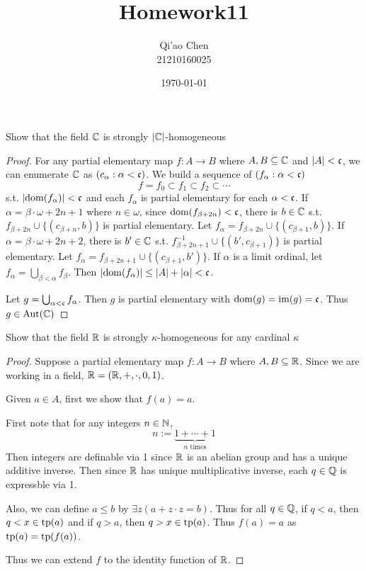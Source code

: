 \documentclass[11pt]{article}
\author{Qi'ao Chen\\21210160025}
\date{\today}
\title{Homework11}
\begin{document}
\maketitle
\begin{exercise}
Show that the field \(\mathbb{C}\) is strongly \(\abs{\C}\)-homogeneous
\end{exercise}

\begin{proof}
For any partial elementary map \(f:A\to B\) where \(A,B\subseteq\mathbb{C}\) and \(\abs{A}<\fc\), we can enumerate \(\mathbb{C}\)
as \((c_\alpha:\alpha<\mathfrak{c})\). We build a sequence of \((f_\alpha:\alpha<\mathfrak{c})\)
\begin{equation*}
f=f_0\subset f_1\subset f_2\subset\cdots
\end{equation*}
s.t. \(\abs{\dom(f_\alpha)}<\fc\) and each \(f_\alpha\) is partial elementary for each \(\alpha<\mathfrak{c}\).
If \(\alpha=\beta\cdot\omega+2n+1\) where \(n\in\omega\), since \(\operatorname{dom}(f_{\beta+2n})<\mathfrak{c}\), there is \(b\in\mathbb{C}\)
s.t. \(f_{\beta+2n}\cup\{(c_{\beta+n},b)\}\) is partial elementary. Let \(f_\alpha=f_{\beta+2n}\cup\{(c_{\beta+1},b)\}\).
If \(\alpha=\beta\cdot\omega+2n+2\), there is \(b'\in\mathbb{C}\) s.t. \(f_{\beta+2n+1}^{-1}\cup\{(b',c_{\beta+1})\}\) is partial elementary.
Let \(f_\alpha=f_{\beta+2n+1}\cup\{(c_{\beta+1},b')\}\). If \(\alpha\) is a limit ordinal, let \(f_\alpha=\bigcup_{\beta<\alpha}f_\beta\).
Then \(\abs{\dom(f_\alpha)}\le\abs{A}+\abs{\alpha}<\fc\).

Let \(g=\bigcup_{\alpha<\mathfrak{c}}f_\alpha\). Then \(g\) is partial elementary with \(\operatorname{dom}(g)=\operatorname{im}(g)=\mathfrak{c}\). Thus \(g\in\operatorname{\text{Aut}}(\mathbb{C})\)
\end{proof}

\begin{exercise}
Show that the field \(\mathbb{R}\) is strongly \(\kappa\)-homogeneous for any cardinal \(\kappa\)
\end{exercise}

\begin{proof}
Suppose a partial elementary map \(f:A\to B\) where \(A,B\subseteq\mathbb{R}\). Since we are working in a
field, \(\mathbb{R}=(\mathbb{R},+,\cdot,0,1)\).

Given \(a\in A\), first we show that \(f(a)=a\).

First note that for any integers \(n\in\mathbb{N}\),
\begin{equation*}
n:=\underbrace{1+\cdots+1}_{n\text{ times}}
\end{equation*}
Then integers are definable via 1 since \(\mathbb{R}\) is an abelian group and has a unique additive inverse.
Then since \(\mathbb{R}\) has unique multiplicative inverse, each \(q\in\mathbb{Q}\) is expressble via 1.

Also, we can define \(a\le b\) by \(\exists z(a+z\cdot z=b)\). Thus for all \(q\in\mathbb{Q}\), if \(q<a\),
then \(q<x\in\operatorname{tp}(a)\) and if \(q>a\), then \(q>x\in\operatorname{tp}(a)\). Thus \(f(a)=a\) as \(\operatorname{tp}(a)=\operatorname{tp}(f(a))\).

Thus we can extend \(f\) to the identity function of \(\mathbb{R}\).
\end{proof}
\end{document}
